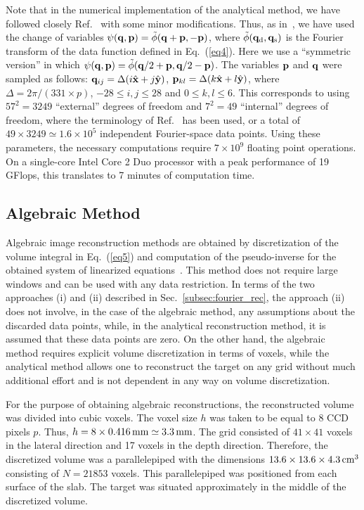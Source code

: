 Note that in the numerical implementation of the analytical method, we
have followed closely Ref.~\cite{konecky_08_1} with some minor
modifications. Thus, as in~\cite{konecky_08_1}, we have used the
change of variables $\psi({\bf q}, {\bf p}) = \tilde{\phi}({\bf q} +
{\bf p}, -{\bf p})$, where $\tilde{\phi}({\bf q}_{\rm d}, {\bf q}_{\rm
  s})$ is the Fourier transform of the data function defined in
Eq.~(\ref{eq4}).  Here we use a ``symmetric version'' in which
$\psi({\bf q}, {\bf p}) = \tilde{\phi}({\bf q}/2 + {\bf p}, {\bf q}/2
- {\bf p})$. The variables ${\bf p}$ and ${\bf q}$ were sampled as
follows: ${\bf q}_{ij} = \Delta (i\hat{\bf x} + j\hat{\bf y})$, ${\bf
  p}_{kl} = \Delta (k\hat{\bf x} + l\hat{\bf y})$, where $\Delta =
2\pi/(331\times p)$, $-28\le i,j\le 28$ and $0\le k,l\le 6$. This
corresponds to using $57^2=3249$ ``external'' degrees of freedom and
$7^2=49$ ``internal'' degrees of freedom, where the terminology of
Ref.~\cite{markel_04_4} has been used, or a total of
$49\times3249\simeq1.6\times10^5$ independent Fourier-space data
points. Using these parameters, the necessary computations require
$7\times 10^{9}$ floating point operations. On a single-core Intel
Core 2 Duo processor with a peak performance of 19 GFlops, this
translates to 7 minutes of computation time.


\subsection{Algebraic Method}
\label{sec:Algebraic}
\label{subsec:alg_rec}

Algebraic image reconstruction methods are obtained by discretization
of the volume integral in Eq.~(\ref{eq5}) and computation of the
pseudo-inverse for the obtained system of linearized
equations~\cite{gonatas_95_1}.  This method does not require large
windows and can be used with any data restriction. In terms of the two
approaches (i) and (ii) described in Sec.~\ref{subsec:fourier_rec},
the approach (ii) does not involve, in the case of the algebraic
method, any assumptions about the discarded data points, while, in the
analytical reconstruction method, it is assumed that these data points
are zero.  On the other hand, the algebraic method requires explicit
volume discretization in terms of voxels, while the analytical method
allows one to reconstruct the target on any grid without much
additional effort and is not dependent in any way on volume
discretization.

For the purpose of obtaining algebraic reconstructions, the
reconstructed volume was divided into cubic voxels. The voxel size $h$
was taken to be equal to 8 CCD pixels $p$. Thus, $h=8\times
0.416\,{\rm mm}\simeq 3.3\,{\rm mm}$. The grid consisted of $41\times
41$ voxels in the lateral direction and 17 voxels in the depth
direction. Therefore, the discretized volume was a parallelepiped with
the dimensions $13.6\times 13.6\times 4.3\,{\rm cm}^3$ consisting of
$N=21853$ voxels. This parallelepiped was positioned from each surface
of the slab. The target was situated approximately in the middle of
the discretized volume.

